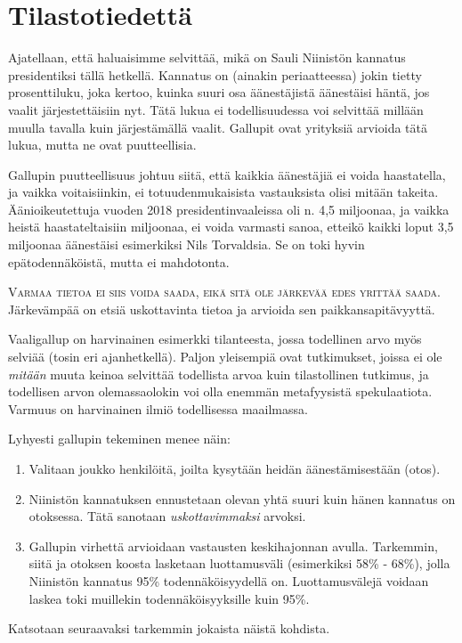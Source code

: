 \documentclass[12pt,leqno,a4paper,oneside]{amsart}
\theoremstyle{definition}
\theoremstyle{remark}
\numberwithin{equation}{section}
\begin{document}
\newpage
\section{Tilastotiedettä}

Ajatellaan, että haluaisimme selvittää, mikä on Sauli Niinistön kannatus presidentiksi tällä hetkellä. Kannatus on (ainakin periaatteessa)
jokin tietty prosenttiluku, joka kertoo, kuinka suuri osa äänestäjistä äänestäisi häntä, jos vaalit järjestettäisiin nyt. Tätä lukua ei 
to\-del\-li\-suu\-des\-sa voi selvittää millään muulla tavalla kuin järjestämällä vaalit. Gallupit ovat yrityksiä arvioida tätä lukua, mutta ne ovat 
puutteellisia.

Gallupin puutteellisuus johtuu siitä, että kaikkia äänestäjiä ei voida haastatella, ja vaikka voitaisiinkin, ei totuudenmukaisista vastauksista
olisi mitään takeita. Äänioikeutettuja vuoden 2018 presidentinvaaleissa oli n. 4,5 miljoonaa, ja vaikka heistä haastateltaisiin miljoonaa, ei voida
varmasti sanoa, etteikö kaikki loput 3,5 miljoonaa äänestäisi esi\-merkiksi Nils Torvaldsia. Se on toki hyvin epätodennäköistä, mutta ei mahdotonta.

\textsc{Varmaa tietoa ei siis voida saada, eikä sitä ole järkevää edes yrittää saada.} Järkevämpää on etsiä uskottavinta tietoa ja arvioida sen 
paikkansapitävyyttä.

Vaaligallup on harvinainen esimerkki tilanteesta, jossa todellinen arvo myös selviää (tosin eri ajanhetkellä). Paljon yleisempiä ovat tutkimukset,
joissa ei ole \emph{mitään} muuta keinoa selvittää todellista arvoa kuin tilastollinen tutkimus, ja todellisen arvon olemassaolokin voi olla
enemmän metafyysistä spekulaatiota. Varmuus on harvinainen ilmiö todellisessa maailmassa.

Lyhyesti gallupin tekeminen menee näin:
\begin{enumerate}
 \item 
 Valitaan joukko henkilöitä, joilta kysytään heidän äänestämisestään (otos).
 \item
 Niinistön kannatuksen ennustetaan olevan yhtä suuri kuin hänen kannatus on otoksessa. Tätä sanotaan \emph{uskottavimmaksi} arvoksi.
 \item
 Gallupin virhettä arvioidaan vastausten keskihajonnan avulla. Tarkemmin, siitä ja otoksen koosta lasketaan luottamusväli (esi\-merkiksi 58\% - 68\%),
 jolla Niinistön kannatus 95\% toden\-näköisyydel\-lä on. Luottamusvälejä voidaan laskea toki muillekin todennäköisyyksille kuin 95\%.
\end{enumerate}
Katsotaan seuraavaksi tarkemmin jokaista näistä kohdista.
\end{document}
